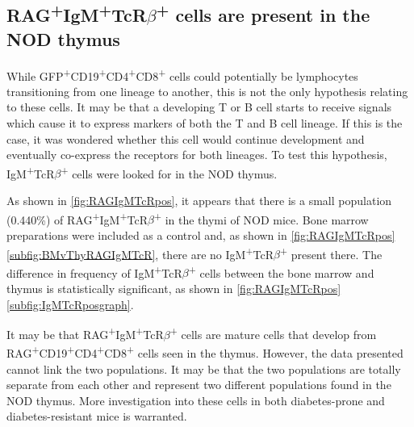 \subsection{RAG\textsuperscript{+}IgM\textsuperscript{+}TcR$\beta$\textsuperscript{+} cells are present in the NOD thymus}

While GFP\textsuperscript{+}CD19\textsuperscript{+}CD4\textsuperscript{+}CD8\textsuperscript{+} cells could potentially be lymphocytes transitioning from one lineage to another, this is not the only hypothesis relating to these cells.
It may be that a developing T or B cell starts to receive signals which cause it to express markers of both the T and B cell lineage.
If this is the case, it was wondered whether this cell would continue development and eventually co-express the receptors for both lineages.
To test this hypothesis, IgM\textsuperscript{+}TcR$\beta$\textsuperscript{+} cells were looked for in the NOD thymus.

As shown in \cref{fig:RAGIgMTcRpos}, it appears that there is a small population (0.440\%) of RAG\textsuperscript{+}IgM\textsuperscript{+}TcR$\beta$\textsuperscript{+} in the thymi of NOD  mice.
Bone marrow preparations were included as a control and, as shown in \cref{fig:RAGIgMTcRpos} \ref{subfig:BMvThyRAGIgMTcR}, there are no IgM\textsuperscript{+}TcR$\beta$\textsuperscript{+} present there.
The difference in frequency of IgM\textsuperscript{+}TcR$\beta$\textsuperscript{+} cells between the bone marrow and thymus is statistically significant, as shown in \cref{fig:RAGIgMTcRpos} \ref{subfig:IgMTcRposgraph}.

It may be that RAG\textsuperscript{+}IgM\textsuperscript{+}TcR$\beta$\textsuperscript{+} cells are mature cells that develop from    RAG\textsuperscript{+}CD19\textsuperscript{+}CD4\textsuperscript{+}CD8\textsuperscript{+} cells seen in the thymus.
However, the data presented cannot link the two populations.
It may be that the two populations are totally separate from each other and represent two different populations found in the NOD thymus. 
More investigation into these cells in both diabetes-prone and diabetes-resistant mice is warranted.



